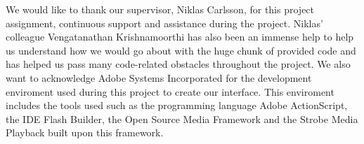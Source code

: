 We would like to thank our supervisor, Niklas Carlsson, for this project assignment, continuous support and assistance during the project. Niklas’ colleague Vengatanathan Krishnamoorthi has also been an immense help to help us understand how we would go about with the huge chunk of provided code and has helped us pass many code-related obstacles throughout the project. 
We also want to acknowledge Adobe Systems Incorporated for the development enviroment used during this project to create our interface. This enviroment includes the tools used such as the programming language Adobe ActionScript, the IDE Flash Builder, the Open Source Media Framework and the Strobe Media Playback built upon this framework.
